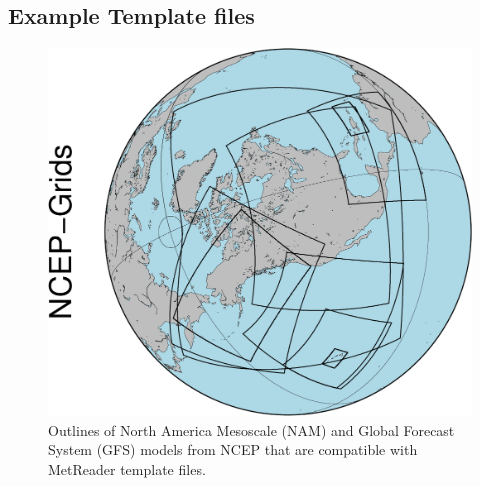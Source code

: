 \documentclass[11pt]{article}   %
\begin{document}
\subsection{Example Template files}\label{ApTemplate}
\begin{figure}[htbp]\begin{center}
 \includegraphics[angle=-90,scale=0.7]{Figs/Overview_NCEP-Grids.pdf}
\parbox{15cm}{\caption{\label{FigNAMs}
Outlines of North America Mesoscale (NAM) and Global Forecast System (GFS)
models from NCEP that are compatible with MetReader template files.
}}
\end{center}\end{figure}

%
%
%
\end{document}
